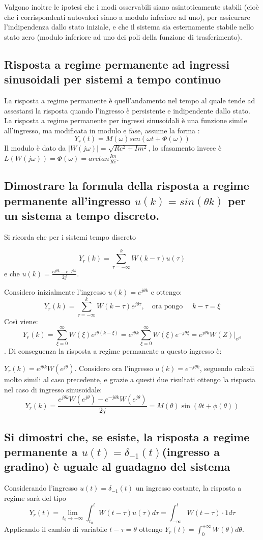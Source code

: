 \documentclass{article}
\begin{document}
Valgono inoltre le ipotesi che i
modi osservabili siano asintoticamente stabili (cioè che i corrispondenti autovalori siano a modulo inferiore ad uno), per assicurare l'indipendenza dallo stato iniziale, e che
il sistema sia esternamente stabile nello stato zero (modulo inferiore ad uno dei
poli della funzione di trasferimento).


\subsection{Risposta a regime permanente ad ingressi sinusoidali per sistemi a tempo continuo}
La risposta a regime permanente è quell'andamento
nel tempo al quale tende ad assestarsi la risposta
quando l'ingresso è persistente e indipendente dallo stato.
La risposta a regime permanente per ingressi sinusoidali
è una funzione simile all'ingresso, ma modificata in modulo e fase, assume la forma :
\[ Y_r(t)=M(\omega)sen(\omega t + \Phi(\omega))\]
Il modulo è dato da $|W(j\omega)|=\sqrt{Re^2+Im^2}$,
lo sfasamento invece è $ L(W(j\omega))=\Phi(\omega)=arctan \frac{Im}{Re}$.


\subsection{\boldmath Dimostrare la formula della risposta a regime permanente all'ingresso $u(k) = sin(\theta k)$ per un sistema a tempo discreto.}
Si ricorda che per i sistemi tempo discreto

\[Y_r(k)=\sum_{\tau =- \infty}^{k} W(k-\tau)u(\tau)\]e che
$u(k)=\frac {e^{j\theta k} - e^{-j\theta k}}{2j} $.


Considero inizialmente l'ingresso $u(k)=e^{j \theta k}$ e ottengo:
\[ 
    Y_r(k)=\sum_{\tau =- \infty}^{k} W(k-\tau)e^{j\theta \tau},
    \quad \text{ora pongo }\quad k-\tau=\xi
\]
Così viene:
\[ Y_r(k)=\sum_{\xi =0}^{\infty} W(\xi)e^{j\theta (k-\xi)} = e^{j\theta k} \sum_{\xi =0}^{\infty} W(\xi)e^{-j\theta \xi}
= e^{j\theta k} W(Z)|_{e^{j \theta}} \].
Di conseguenza la risposta a regime permanente a questo ingresso è:

$Y_r(k)=e^{j \theta k}W(e^{j \theta})$.
Considero ora l'ingresso $u(k)=e^{-j \theta k}$, seguendo calcoli molto simili al caso precedente,
e grazie a questi due risultati ottengo la risposta
nel caso di ingresso sinusoidale:
\[
    Y_r(k)=\frac{e^{j \theta k}W(e^{j \theta})-e^{-j \theta k}W(e^{j \theta})}{2j}
    = M(\theta)\sin(\theta t +\phi(\theta))
\]


\subsection{\boldmath Si dimostri che, se esiste, la risposta a regime permanente a $u(t) = \delta _{-1}(t)$(ingresso a gradino) è uguale al guadagno del sistema}
Considerando l'ingresso $u(t) = \delta_{-1}(t)$ un ingresso costante,
la risposta a regime sarà del tipo 
\[ 
    Y_r(t)= \lim_{t_0 \to -\infty} \int_{t_0}^{t}W(t-\tau)u(\tau)d\tau=\int_{-\infty}^{t}W(t-\tau)\cdot 1 d\tau
\]
Applicando il cambio di variabile $t-\tau = \theta$ ottengo $Y_r(t)=\int_{0}^{+\infty}W(\theta) d\theta$.
\end{document}
